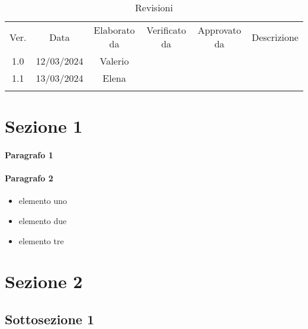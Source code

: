 \documentclass[italian,9.5pt]{article} %
\begin{document}


\newpage



\tableofcontents


\begin{table}[!b]
	\caption {Revisioni} \label{tab:title}
	\begin{center}
		\begin{tabular}{ c c c c c c }
			\hline
			Ver. & Data       & Elaborato da & Verificato da & Approvato da & Descrizione \\
			1.0  & 12/03/2024 & Valerio                                                   \\
			1.1  & 13/03/2024 & Elena                                                     \\                                                                      \\
			\hline
		\end{tabular}
	\end{center}
\end{table}

\newpage


\section{Sezione 1}

\paragraph{Paragrafo 1}

\paragraph{Paragrafo 2}
\begin{itemize}
	\item elemento uno
	\item elemento due
	\item elemento tre
\end{itemize}



\section{Sezione 2}
\subsection{Sottosezione 1}
\end{document}
